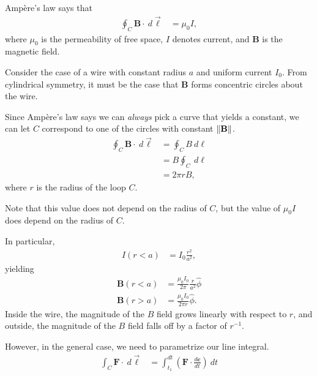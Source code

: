 \documentclass[10pt]{mypackage}
\begin{document}
\begin{example}
  Ampère's law says that
  \begin{align*}
    \oint_{C}^{} \mathbf{B}\cdot \:d\vec{\ell} &= \mu_0 I,
  \end{align*}
  where $\mu_0$ is the permeability of free space, $I$ denotes current, and $\mathbf{B}$ is the magnetic field.\newline

  Consider the case of a wire with constant radius $a$ and uniform current $I_0$. From cylindrical symmetry, it must be the case that $\mathbf{B}$ forms concentric circles about the wire.\newline

  Since Ampère's law says we can \textit{always} pick a curve that yields a constant, we can let $C$ correspond to one of the circles with constant $\norm{\mathbf{B}}$.
  \begin{align*}
    \oint_{C}^{} \mathbf{B}\cdot\:d\vec{\ell} &= \oint_{C}^{} B\:d\ell\\
                                             &= B\oint_{C}^{} \:d\ell\\
                                             &= 2\pi r B,
  \end{align*}
  where $r$ is the radius of the loop $C$.\newline

  Note that this value does not depend on the radius of $C$, but the value of $\mu_0 I$ does depend on the radius of $C$.\newline

  In particular,
  \begin{align*}
    I\left(r < a\right) &= I_0\frac{r^2}{a^2},
  \end{align*}
  yielding
  \begin{align*}
    \mathbf{B}\left(r < a\right) &= \frac{\mu_0 I_0}{2\pi}\frac{r}{a^2}\hat{\phi}\\
    \mathbf{B}\left(r > a\right) &= \frac{\mu_0I_0}{2\pi r} \hat{\phi}.
  \end{align*}
  Inside the wire, the magnitude of the $B$ field grows linearly with respect to $r$, and outside, the magnitude of the $B$ field falls off by a factor of $r^{-1}$.
\end{example}
However, in the general case, we need to parametrize our line integral.
\begin{align*}
  \int_{C}^{} \mathbf{F}\cdot\:d\vec{\ell} &= \int_{t_1}^{dt} \left(\mathbf{F}\cdot \frac{d\mathbf{c}}{dt}\right)\:dt
\end{align*}
\end{document}
